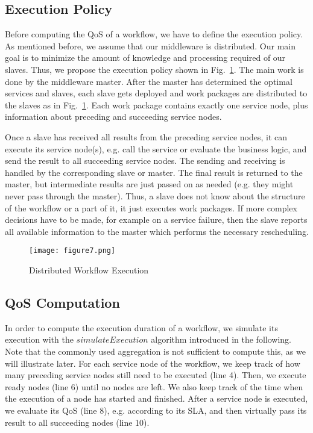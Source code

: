 \documentclass[10pt, conference, compsocconf]{IEEEtran}
\newcommand{\oneImage}{3.2in}
\begin{document}
\subsection{Execution Policy}
\label{exPolicy}
\noindent Before computing the QoS of a workflow,
	we have to define the execution policy.
As mentioned before, we assume that our middleware is distributed.
Our main goal is to minimize the amount of knowledge and processing required of our slaves.
Thus, we propose the execution policy shown in Fig.~\ref{fig:workflow_execution}.
The main work is done by the middleware master.
After the master has determined the optimal services and slaves,
	each slave gets deployed and work packages are distributed to the slaves as in Fig.~\ref{fig:workflow_execution}.
Each work package contains exactly one service node, plus information about preceding and succeeding service nodes.

Once a slave has received all results from the preceding service nodes,
	it can execute its service node(s), e.g. call the service or evaluate the business logic,
		and send the result to all succeeding service nodes.
The sending and receiving is handled by the corresponding slave or master.
The final result is returned to the master,
	but intermediate results are just passed on as needed (e.g. they might never pass through the master).
Thus, a slave does not know about the structure of the workflow or a part of it, it just executes work packages.
If more complex decisions have to be made,
	for example on a service failure,
		then the slave reports all available information to the master
			which performs the necessary rescheduling.
      
\begin{figure}[hb!]
	\centering
	\texttt{[image: figure7.png]}
	\caption{Distributed Workflow Execution}
	\label{fig:workflow_execution}
\end{figure}

\subsection{QoS Computation}
\label{qos:formal}

\noindent In order to compute the execution duration of a workflow,
	we simulate its execution with the $simulateExecution$ algorithm
		introduced in the following.
Note that the commonly used aggregation is not sufficient to compute this,	as we will illustrate later.
For each service node of the workflow, we keep track of how many preceding service nodes still need to be executed (line 4).
Then, we execute ready nodes (line 6) until no nodes are left.
We also keep track of the time when the execution of a node has started and finished.
After a service node is executed, we evaluate its QoS (line 8), e.g. according to its SLA,
	and then virtually pass its result to all succeeding nodes (line 10).
\end{document}
